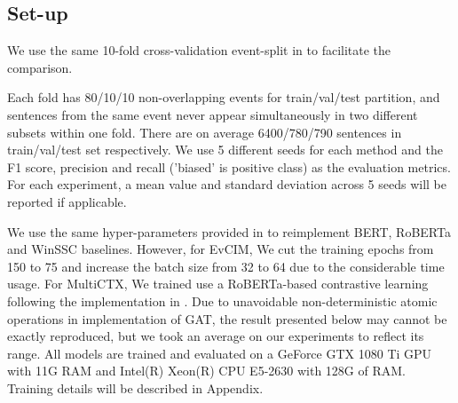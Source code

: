 








\subsection{Set-up}

We use the same 10-fold cross-validation event-split in \citet{van-den-berg-markert-2020-context} to facilitate the comparison.

Each fold has 80/10/10 non-overlapping events for train/val/test partition, and sentences from the same event never appear simultaneously in two different subsets within one fold. There are on average 6400/780/790 sentences in train/val/test set respectively. We use 5 different seeds for each method and the F1 score, precision and recall ('biased' is positive class) as the evaluation metrics. For each experiment, a mean value and standard deviation across 5 seeds will be reported if applicable.

We use the same hyper-parameters provided in \citep{van-den-berg-markert-2020-context} to reimplement BERT, RoBERTa and WinSSC baselines. However, for EvCIM, We cut the training epochs from 150 to 75 and increase the batch size from 32 to 64 due to the considerable time usage. For MultiCTX, We trained  use a RoBERTa-based contrastive learning following the implementation in \citep{gao2021simcse}. Due to unavoidable non-deterministic atomic operations in implementation of GAT, the result presented below may cannot be exactly reproduced, but we took an average on our experiments to reflect its range. All models are trained and evaluated on a GeForce GTX 1080 Ti GPU with 11G RAM and Intel(R) Xeon(R) CPU E5-2630 with 128G of RAM. Training details will be described in Appendix.



